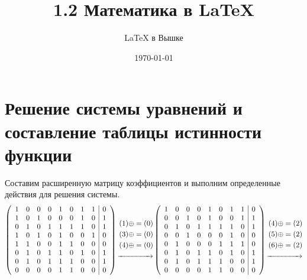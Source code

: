 \documentclass[a4paper,10pt]{article} %
\author{\LaTeX{} в Вышке}
\title{1.2 Математика в \LaTeX}
\date{\today}
\begin{document}
	\maketitle
	
	\section{Решение системы уравнений и составление таблицы истинности функции}
	
	Составим расширенную матрицу коэффициентов и выполним определенные действия для решения системы.
	\begin{multline*}
		\left(
		\begin{array}{cccccccc|c}
		1 & 0 & 0 & 0 & 1 & 0 & 1 & 1 & 0 \\
		1 & 0 & 1 & 0 & 0 & 0 & 1 & 0 & 1 \\
		0 & 1 & 0 & 1 & 1 & 1 & 1 & 0 & 1 \\
		1 & 0 & 1 & 0 & 1 & 0 & 0 & 1 & 0 \\
		1 & 1 & 0 & 0 & 1 & 1 & 0 & 0 & 0 \\
		0 & 1 & 0 & 1 & 1 & 0 & 1 & 0 & 1 \\
		0 & 1 & 0 & 1 & 1 & 1 & 0 & 0 & 1 \\
		0 & 0 & 0 & 0 & 1 & 1 & 0 & 0 & 0 \\
		\end{array}
		\right)
		\begin{align}
		(1) \oplus= (0)\\
		(3) \oplus= (0)\\
		(4) \oplus= (0)\\
		\xrightarrow{\hspace*{1.5cm}}
		\end{align}
		\left(
		\begin{array}{cccccccc|c}
		1 & 0 & 0 & 0 & 1 & 0 & 1 & 1 & 0 \\
		0 & 0 & 1 & 0 & 1 & 0 & 0 & 1 & 1 \\
		0 & 1 & 0 & 1 & 1 & 1 & 1 & 0 & 1 \\
		0 & 0 & 1 & 0 & 0 & 0 & 1 & 0 & 0 \\
		0 & 1 & 0 & 0 & 0 & 1 & 1 & 1 & 0 \\
		0 & 1 & 0 & 1 & 1 & 0 & 1 & 0 & 1 \\
		0 & 1 & 0 & 1 & 1 & 1 & 0 & 0 & 1 \\
		0 & 0 & 0 & 0 & 1 & 1 & 0 & 0 & 0 \\
		\end{array}
		\right)
		\begin{align}
		(4) \oplus= (2)\\
		(5) \oplus= (2)\\
		(6) \oplus= (2)\\
		\xrightarrow{\hspace*{1.5cm}}
		\end{align}\\
\end{multline*}
\end{document}
